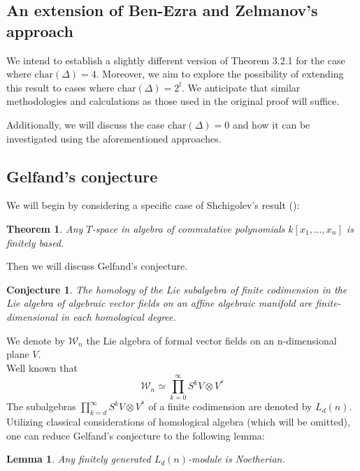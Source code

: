 \documentclass[12pt,a4paper]{article}
\newtheorem{theorem}{Theorem}[subsection]
\newtheorem{lemma}{Lemma}[subsection]
\newtheorem*{conjecture*}{Conjecture}
\begin{document}
    \subsection{An extension of Ben-Ezra and Zelmanov's approach}
    We intend to establish a slightly different version of Theorem 3.2.1 for the case where $\mathrm{char}(\Delta)=4$.
    Moreover, we aim to explore the possibility of extending this result to cases where $\mathrm{char}(\Delta)=2^l$.
    We anticipate that similar methodologies and calculations as those used in the original proof will suffice.

    Additionally, we will discuss the case $\mathrm{char}(\Delta)=0$ and how it can be investigated using the aforementioned approaches.

    \subsection{Gelfand's conjecture}
    We will begin by considering a specific case of Shchigolev's result (\cite{Shchigolev}):
    \vskip 0.1in\noindent
    \begin{theorem}
        Any  $T$-space in algebra of commutative polynomials $k[x_1,\ldots,x_n]$ is finitely based.
    \end{theorem}
    \vskip 0.1in\noindent

    Then we will discuss Gelfand's conjecture.

    \vskip 0.1in\noindent
    \begin{conjecture*}
        The homology of the Lie subalgebra of finite codimension in the Lie algebra of algebraic vector fields on an affine algebraic manifold are finite-dimensional in each
        homological degree.
    \end{conjecture*}
    \vskip 0.1in\noindent

    We denote by $\mathcal{W}_n$ the Lie algebra of formal vector fields on an n-dimensional plane $V$.\\
    Well known that
    \[\mathcal{W}_n\simeq \prod\limits_{k=0}^{\infty}S^k V\otimes V^*\]
    The subalgebras $\prod\limits_{k=d}^{\infty}S^k V\otimes V^*$ of a finite codimension are denoted by $L_d(n)$.
    Utilizing classical considerations of homological algebra (which will be omitted), one can reduce Gelfand's conjecture to the following lemma:
    \vskip 0.1in\noindent
    \begin{lemma}
        Any finitely generated $L_d(n)$-module is Noetherian.
    \end{lemma}
    \vskip 0.1in\noindent
\end{document}
